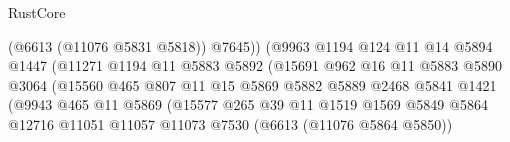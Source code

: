 \begin{lexlean}{RustCore}
\begin{coremodule}
                                          (@6613 (@11076 @5831 @5818))
                                          @7645))
                                      (@9963
                                        @1194
                                        @124
                                        @11
                                        @14
                                        @5894
                                        @1447
                                        (@11271
                                          @1194
                                          @11
                                          @5883
                                          @5892
                                          (@15691
                                            @962
                                            @16
                                            @11
                                            @5883
                                            @5890
                                            @3064
                                            (@15560
                                              @465
                                              @807
                                              @11
                                              @15
                                              @5869
                                              @5882
                                              @5889
                                              @2468
                                              @5841
                                              @1421
                                              (@9943
                                                @465
                                                @11
                                                @5869
                                                (@15577
                                                  @265
                                                  @39
                                                  @11
                                                  @1519
                                                  @1569
                                                  @5849
                                                  @5864
                                                  @12716
                                                  @11051
                                                  @11057
                                                  @11073
                                                  @7530
                                                  (@6613 (@11076 @5864 @5850))

\end{coremodule}
\end{lexlean}

